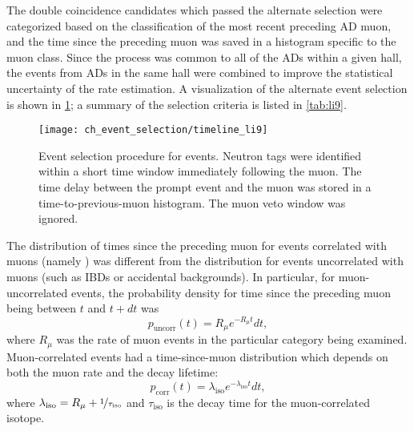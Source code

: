 The double coincidence candidates which passed the alternate selection
were categorized based on the classification
of the most recent preceding AD muon,
and the time since the preceding muon
was saved in a histogram specific to the muon class.
Since the \li{} process was common to all of the ADs within a given hall,
the events from ADs in the same hall were combined
to improve the statistical uncertainty of the rate estimation.
A visualization of the alternate event selection
is shown in \cref{fig:li9_timeline};
a summary of the selection criteria is listed in \cref{tab:li9}.

\begin{figure}
    \centering
    \texttt{[image: ch\_event\_selection/timeline\_li9]}
    \caption[\li{}/\he{} event selection]{
        Event selection procedure for \li{} events.
        Neutron tags were identified within a short time window
        immediately following the muon.
        The time delay between the prompt event and the muon
        was stored in a time-to-previous-muon histogram.
        The muon veto window was ignored.
    }
    \label{fig:li9_timeline}
\end{figure}

The distribution of times since the preceding muon
for events correlated with muons (namely \li{})
was different from the distribution for events uncorrelated with muons
(such as IBDs or accidental backgrounds).
In particular, for muon-uncorrelated events,
the probability density for time since the preceding muon
being between $t$ and $t + dt$ was \cite{chris_li9}
\begin{equation}\label{eq:li9_muon_uncorr}
    p_\text{uncorr}(t) = R_\mu e^{-R_\mu t}dt,
\end{equation}
where $R_\mu$ was the rate of muon events in the particular category being examined.
Muon-correlated events had a time-since-muon distribution
which depends on both the muon rate and the decay lifetime:
\begin{equation}\label{eq:li9_muon_corr}
    p_\text{corr}(t) = \lambda_\text{iso} e^{-\lambda_\text{iso} t}dt,
\end{equation}
where $\lambda_\text{iso} = R_\mu + \nicefrac{1}{\tau_\text{iso}}$
and $\tau_\text{iso}$ is the decay time
for the muon-correlated isotope.

